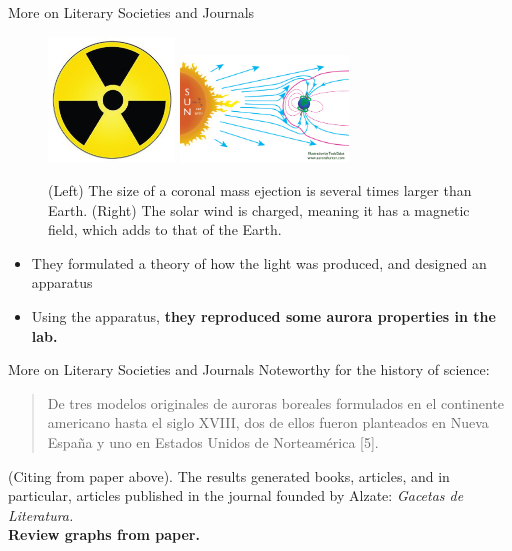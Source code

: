 \documentclass{beamer}
\begin{document}
\begin{frame}{More on Literary Societies and Journals}
\small
\begin{figure}
\includegraphics[width=0.3\textwidth]{figures/rad.jpg}
\includegraphics[width=0.4\textwidth]{figures/how-the-auroras-form.png}
\caption{(Left) The size of a coronal mass ejection is several times larger than Earth. (Right) The solar wind is charged, meaning it has a magnetic field, which adds to that of the Earth.}
\end{figure}
\begin{itemize}
\item They formulated a theory of how the light was produced, and designed an apparatus
\item Using the apparatus, \textbf{they reproduced some aurora properties in the lab.}
\end{itemize}
\end{frame}

\begin{frame}{More on Literary Societies and Journals}
\alert{Noteworthy for the history of science}: \\ \vspace{0.5cm}
\begin{quote}
De tres modelos originales de auroras boreales formulados en el continente americano hasta el siglo XVIII, dos de ellos fueron planteados en Nueva España y uno en Estados Unidos de Norteamérica [5].
\end{quote}
(Citing from paper above).  The results generated books, articles, and in particular, articles published in the journal founded by Alzate: \textit{Gacetas de Literatura.} \\
\textbf{Review graphs from paper.}
\end{frame}
\end{document}
